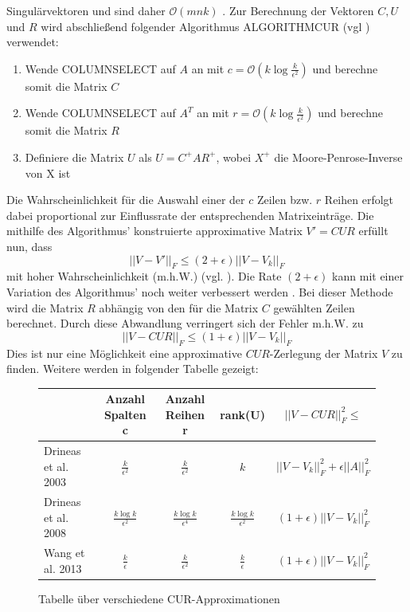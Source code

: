 \documentclass[12pt,a4paper,twoside]{article}
\begin{document}
		Singulärvektoren und sind daher $\mathcal{O}(mnk)$ \citep{mahoney2008}.\newline
		Zur Berechnung der Vektoren $C,U$ und $R$ wird abschließend folgender Algorithmus ALGORITHMCUR (vgl \citep{mahoney2008}) verwendet:
		\begin{enumerate}
			\item Wende COLUMNSELECT auf $A$ an mit $c=\mathcal{O}(k \log \frac{k}{\epsilon^2})$ und berechne somit die Matrix $C$
			\item Wende COLUMNSELECT auf $A^T$ an mit $r=\mathcal{O}(k \log \frac{k}{\epsilon^2})$ und berechne somit die Matrix $R$
			\item Definiere die Matrix $U$ als $U=C^+AR^+$, wobei $X^+$ die Moore-Penrose-Inverse \citep{penrose1955} von X ist
		\end{enumerate}
		Die Wahrscheinlichkeit für die Auswahl einer der $c$ Zeilen bzw. $r$ Reihen erfolgt dabei proportional zur Einflussrate der entsprechenden Matrixeinträge. \newline
		\newline
		Die mithilfe des Algorithmus' konstruierte approximative Matrix $V'=CUR$ erfüllt nun, dass
		\begin{equation*}
			||V-V'||_F\leq (2+\epsilon )||V-V_k||_F
		\end{equation*}		
		mit hoher Wahrscheinlichkeit (m.h.W.) (vgl. \citep{mahoney2008}). \newline
		\newline
		Die Rate $(2+\epsilon)$ kann mit einer Variation des Algorithmus' noch weiter verbessert werden \citep{Drineas2009}. Bei dieser Methode wird die Matrix $R$ abhängig von den für die Matrix $C$ gewählten Zeilen berechnet. Durch diese Abwandlung verringert sich der Fehler m.h.W. zu
		\begin{equation*}
			||V-CUR||_F\leq (1+\epsilon)||V-V_k||_F
		\end{equation*}
		Dies ist nur eine Möglichkeit eine approximative $CUR$-Zerlegung der Matrix $V$ zu finden. Weitere werden in 
		folgender Tabelle gezeigt: \newline
		\begin{figure}[h]
			\begin{tabular}{l||c|c|c|c}
		 		& Anzahl Spalten c & Anzahl Reihen r & rank(U) & $||V-CUR||_F^2\leq$ \\
		 		\hline \hline
		 		Drineas et al. 2003 \citep{drineas2003} & $\frac{k}{\epsilon^2}$ & $\frac{k}{\epsilon^2}$ & $k$ & $||V-V_k||_F^2+\epsilon||A||^2_F$ \\
		 		\hline
		 		Drineas et al. 2008 \citep{Drineas2009} & $\frac{k\log k}{\epsilon^2}$ & $\frac{k\log k}{\epsilon^4}$ & $\frac{k\log k}{\epsilon^2}$ & $(1+\epsilon)||V-V_k||^2_F$ \\
		 		\hline
		 		Wang et al. 2013 \citep{Wang2013}& $\frac{k}{\epsilon}$ & $\frac{k}{\epsilon^2}$ & $\frac{k}{\epsilon}$ & $(1+\epsilon)||V-V_k||^2_F$
			\end{tabular}
			\caption{Tabelle über verschiedene CUR-Approximationen}
		\end{figure}
		
\end{document}
